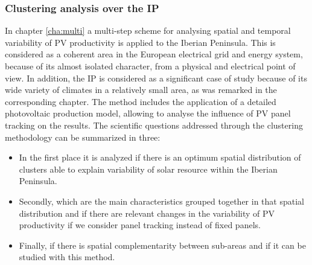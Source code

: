 

\subsubsection{Clustering analysis over the IP}

In chapter \ref{cha:multi} a multi-step scheme for analysing spatial and temporal variability of PV productivity is applied to the Iberian Peninsula. This is considered as a coherent area in the European electrical grid and energy system, because of its almost isolated character, from a physical and electrical point of view. In addition, the IP is considered as a significant case of study because of its wide variety of climates in a relatively small area, as was remarked in the corresponding chapter. The method includes the application of a detailed photovoltaic production model, allowing to analyse the influence of PV panel tracking on the results. The scientific questions addressed through the clustering methodology can be summarized in three:

\begin{itemize}
  
\item In the first place it is analyzed if there is an optimum spatial distribution of clusters able to explain variability of solar resource within the Iberian Peninsula.

\item Secondly, which are the main characteristics grouped together in that spatial distribution and if there are relevant changes in the variability of PV productivity if we consider panel tracking instead of fixed panels.

\item Finally, if there is spatial complementarity between sub-areas and if it can be studied with this method.

\end{itemize}


